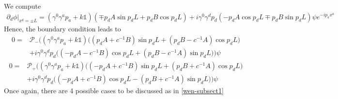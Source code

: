  We compute
\begin{equation*}
\begin{split}
\partial_d \phi\vert_{x^d = \pm L }
= (\gamma^0\gamma^a p_a + k\mathbb{1})(\mp p_d A \sin p_d L + p_d B \cos p_d L)
+ i\gamma^0\gamma^d p_d(-p_d A \cos p_d L \mp p_d B \sin p_d L)\psi e^{-ip_a x^a}
\end{split}
\end{equation*}
Hence, the boundary condition leads to
\begin{equation*}
\begin{split}
0 = &\mathcal{P}_-\Bigg(
(\gamma^0\gamma^a p_a + k\mathbb{1})\Big((p_d A + c^{-1}B) \sin p_d L + (p_d B - c^{-1}A) \cos p_d L\Big) \\
& + i\gamma^0\gamma^d p_d \Big((-p_d A -c^{-1} B) \cos p_d L + (p_d B - c^{-1} A )\sin p_d L\Big) 
\Bigg)\psi
\end{split}
\end{equation*}
\begin{equation*}
\begin{split}
0 = &\mathcal{P}_+\Bigg(
(\gamma^0\gamma^a p_a + k\mathbb{1})\Big((- p_d A + c^{-1}B) \sin p_d L + (p_d B + c^{-1}A) \cos p_d L\Big) \\
& + i\gamma^0\gamma^d p_d \Big((-p_d A + c^{-1} B )\cos p_d L - (p_d B + c^{-1} A )\sin p_d L\Big) 
\Bigg)\psi
\end{split}
\end{equation*}
Once again, there are 4 possible cases to be discussed as in \cref{wen-subsect1}
%
